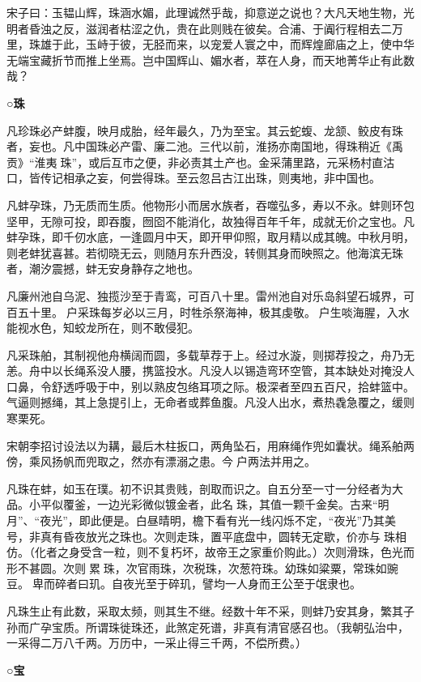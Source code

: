 \documentclass[]{article}
\begin{document}
宋子曰：玉韫山辉，珠涵水媚，此理诚然乎哉，抑意逆之说也？大凡天地生物，光明者昏浊之反，滋润者枯涩之仇，贵在此则贱在彼矣。合浦、于阗行程相去二万里，珠雄于此，玉峙于彼，无胫而来，以宠爱人寰之中，而辉煌廊庙之上，使中华无端宝藏折节而推上坐焉。岂中国辉山、媚水者，萃在人身，而天地菁华止有此数哉？

\textbf{○珠}

凡珍珠必产蚌腹，映月成胎，经年最久，乃为至宝。其云蛇蝮、龙颔、鲛皮有珠者，妄也。凡中国珠必产雷、廉二池。三代以前，淮扬亦南国地，得珠稍近《禹贡》``淮夷珠''，或后互市之便，非必责其土产也。金采蒲里路，元采杨村直沽口，皆传记相承之妄，何尝得珠。至云忽吕古江出珠，则夷地，非中国也。

凡蚌孕珠，乃无质而生质。他物形小而居水族者，吞噬弘多，寿以不永。蚌则环包坚甲，无隙可投，即吞腹，囫囵不能消化，故独得百年千年，成就无价之宝也。凡蚌孕珠，即千仞水底，一逢圆月中天，即开甲仰照，取月精以成其魄。中秋月明，则老蚌犹喜甚。若彻晓无云，则随月东升西没，转侧其身而映照之。他海滨无珠者，潮汐震撼，蚌无安身静存之地也。

凡廉州池自乌泥、独揽沙至于青鸾，可百八十里。雷州池自对乐岛斜望石城界，可百五十里。户采珠每岁必以三月，时牲杀祭海神，极其虔敬。户生啖海腥，入水能视水色，知蛟龙所在，则不敢侵犯。

凡采珠舶，其制视他舟横阔而圆，多载草荐于上。经过水漩，则掷荐投之，舟乃无恙。舟中以长绳系没人腰，携篮投水。凡没人以锡造弯环空管，其本缺处对掩没人口鼻，令舒透呼吸于中，别以熟皮包络耳项之际。极深者至四五百尺，拾蚌篮中。气逼则撼绳，其上急提引上，无命者或葬鱼腹。凡没人出水，煮热毳急覆之，缓则寒栗死。

宋朝李招讨设法以为耩，最后木柱扳口，两角坠石，用麻绳作兜如囊状。绳系舶两傍，乘风扬帆而兜取之，然亦有漂溺之患。今户两法并用之。

凡珠在蚌，如玉在璞。初不识其贵贱，剖取而识之。自五分至一寸一分经者为大品。小平似覆釜，一边光彩微似镀金者，此名珠，其值一颗千金矣。古来``明月''、``夜光''，即此便是。白昼晴明，檐下看有光一线闪烁不定，``夜光''乃其美号，非真有昏夜放光之珠也。次则走珠，置平底盘中，圆转无定歇，价亦与珠相仿。（化者之身受含一粒，则不复朽坏，故帝王之家重价购此。）次则滑珠，色光而形不甚圆。次则累珠，次官雨珠，次税珠，次葱符珠。幼珠如粱粟，常珠如豌豆。卑而碎者曰玑。自夜光至于碎玑，譬均一人身而王公至于氓隶也。

凡珠生止有此数，采取太频，则其生不继。经数十年不采，则蚌乃安其身，繁其子孙而广孕宝质。所谓珠徙珠还，此煞定死谱，非真有清官感召也。（我朝弘治中，一采得二万八千两。万历中，一采止得三千两，不偿所费。）

\textbf{○宝}
\end{document}
